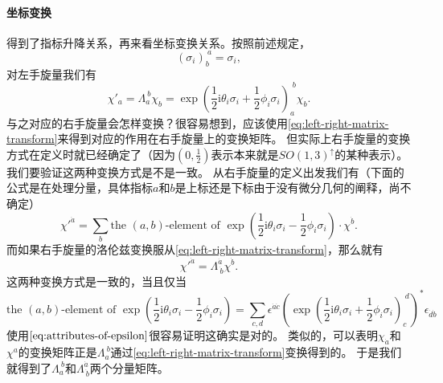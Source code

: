 \documentclass[hyperref, UTF8, a4paper]{ctexart}
\newcommand*{\ii}{\mathrm{i}}
\begin{document}
\paragraph{坐标变换} 得到了指标升降关系，再来看坐标变换关系。按照前述规定，
\[
    (\sigma_i)_b^{\ a} = \sigma_i,
\]
对左手旋量我们有
\[
    \chi'_a = \Lambda_a^{\ b} \chi_b = \exp \left( \frac{1}{2} \ii \theta_i \sigma_i + \frac{1}{2} \phi_i \sigma_i \right)_a^{\; b} \chi_b.
\]
与之对应的右手旋量会怎样变换？很容易想到，应该使用\eqref{eq:left-right-matrix-transform}来得到对应的作用在右手旋量上的变换矩阵。
但实际上右手旋量的变换方式在定义时就已经确定了（因为$(0, \frac{1}{2})$表示本来就是$SO(1,3)^\uparrow$的某种表示）。
我们要验证这两种变换方式是不是一致。
从右手旋量的定义出发我们有（下面的公式是在处理分量，具体指标$a$和$b$是上标还是下标由于没有微分几何的阐释，尚不确定）
\[
    {\chi'}^{\dot{a}} = \sum_b \text{the $(a,b)$-element of } \exp \left( \frac{1}{2} \ii \theta_i \sigma_i - \frac{1}{2} \phi_i \sigma_i \right) \cdot \chi^{\dot{b}} .
\]
而如果右手旋量的洛伦兹变换服从\eqref{eq:left-right-matrix-transform}，那么就有
\[
    {\chi'}^{\dot{a}} = \Lambda^{\dot{a}}_{\ \dot{b}} \chi^{\dot{b}}.
\]
这两种变换方式是一致的，当且仅当
\[
    \text{the $(a,b)$-element of } \exp \left( \frac{1}{2} \ii \theta_i \sigma_i - \frac{1}{2} \phi_i \sigma_i \right) = \sum_{c,d} \epsilon^{\dot{a} \dot{c}} \left(\exp \left( \frac{1}{2} \ii \theta_i \sigma_i + \frac{1}{2} \phi_i \sigma_i \right)_c^{\; d}\right)^* \epsilon_{\dot{d} \dot{b}}
\]
使用$\eqref{eq:attributes-of-epsilon}$很容易证明这确实是对的。
类似的，可以表明$\chi_{\dot{a}}$和$\chi^a$的变换矩阵正是$\Lambda_a^{\ b}$通过\eqref{eq:left-right-matrix-transform}变换得到的。
于是我们就得到了$\Lambda_a^{\ b}$和$\Lambda^{\dot{a}}_{\ \dot{b}}$两个分量矩阵。
\end{document}
